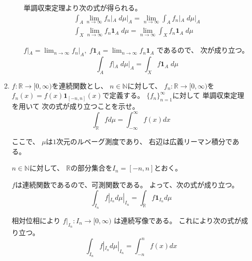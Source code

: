 \documentclass[12pt,b5paper]{ltjsarticle}
\begin{document}
\begin{enumerate}
\begin{enumerate}
            単調収束定理より次の式が得られる。
            \begin{gather}
              \int_{A} \lim_{n\to\infty} f_{n}|_{A} \; d\mu|_{A}
             = \lim_{n\to\infty} \int_{A} f_{n}|_{A} \; d\mu|_{A}
              \\
              \int_{X} \lim_{n\to\infty} f_{n}\mathbf{1}_{A} \; d\mu
             =  \lim_{n\to\infty} \int_{X} f_{n}\mathbf{1}_{A} \; d\mu
            \end{gather}

            $f|_{A} = \lim_{n\to\infty} f_{n}|_{A},\;
            f\mathbf{1}_{A} = \lim_{n\to\infty} f_{n}\mathbf{1}_{A}$
            であるので、
            次が成り立つ。
            \begin{equation}
             \int_{A} f|_{A} \; d\mu|_{A}
              = \int_{X} f\mathbf{1}_{A} \; d\mu
            \end{equation}

            \hrulefill

      \end{enumerate}


 \item
      $f:\mathbb{R} \to [0,\infty)$を連続関数とし、
      $n\in \mathbb{N}$に対して、
      $f_{n}:\mathbb{R} \to [0,\infty)$を
      $f_{n}(x)=f(x)\mathbf{1}_{[-n,n]}(x)$で定義する。
      $\{ f_{n} \}_{n=1}^{\infty}$に対して
      単調収束定理を用いて
      次の式が成り立つことを示せ。
      \begin{equation}
       \int_{\mathbb{R}}f d\mu = \int_{-\infty}^{\infty}f(x)dx
      \end{equation}

      ここで、
      $\mu$は$1$次元のルベーグ測度であり、
      右辺は広義リーマン積分である。

      \dotfill


      $n\in\mathbb{N}$に対して、
      $\mathbb{R}$の部分集合を$I_{n}=[-n,n]$とおく。

      $f$は連続関数であるので、可測関数である。
      よって、次の式が成り立つ。
      \begin{equation}
       \int_{I_{n}} f|_{I_{n}} d\mu|_{I_{n}}
        = \int_{\mathbb{R}} f \mathbf{1}_{I_{n}} d \mu
      \end{equation}

      相対位相により
      $f|_{I_{n}} : I_{n}\to[0,\infty)$
      は連続写像である。
      これにより次の式が成り立つ。
      \begin{equation}
       \int_{I_{n}} f|_{I_{n}} d\mu|_{I_{n}}
        = \int_{-n}^{n} f(x) dx
      \end{equation}


\end{enumerate}
\end{document}
